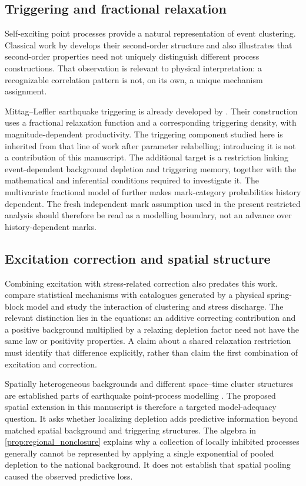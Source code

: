 \subsection{Triggering and fractional relaxation}

Self-exciting point processes provide a natural representation of event clustering. Classical work by \citet{Hawkes1971} develops their second-order structure and also illustrates that second-order properties need not uniquely distinguish different process constructions. That observation is relevant to physical interpretation: a recognizable correlation pattern is not, on its own, a unique mechanism assignment.

Mittag--Leffler earthquake triggering is already developed by \citet{DavisBaeumerWang2024}. Their construction uses a fractional relaxation function and a corresponding triggering density, with magnitude-dependent productivity. The triggering component studied here is inherited from that line of work after parameter relabelling; introducing it is not a contribution of this manuscript. The additional target is a restriction linking event-dependent background depletion and triggering memory, together with the mathematical and inferential conditions required to investigate it. The multivariate fractional model of \citet{DavisBaeumerWang2026} further makes mark-category probabilities history dependent. The fresh independent mark assumption used in the present restricted analysis should therefore be read as a modelling boundary, not an advance over history-dependent marks.

\subsection{Excitation correction and spatial structure}

Combining excitation with stress-related correction also predates this work. \citet{PetrilloZhuangLippiello2023} compare statistical mechanisms with catalogues generated by a physical spring-block model and study the interaction of clustering and stress discharge. The relevant distinction lies in the equations: an additive correcting contribution and a positive background multiplied by a relaxing depletion factor need not have the same law or positivity properties. A claim about a shared relaxation restriction must identify that difference explicitly, rather than claim the first combination of excitation and correction.

Spatially heterogeneous backgrounds and different space--time cluster structures are established parts of earthquake point-process modelling \citep{Ogata1998}. The proposed spatial extension in this manuscript is therefore a targeted model-adequacy question. It asks whether localizing depletion adds predictive information beyond matched spatial background and triggering structures. The algebra in \cref{prop:regional_nonclosure} explains why a collection of locally inhibited processes generally cannot be represented by applying a single exponential of pooled depletion to the national background. It does not establish that spatial pooling caused the observed predictive loss.

